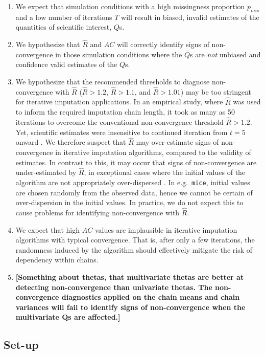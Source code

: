 \documentclass[Royal,times,sageh]{sagej}
\begin{document}
\begin{enumerate}
\def\labelenumi{\arabic{enumi}.}
\item
  We expect that simulation conditions with a high missingness proportion \(p_{mis}\) and a low number of iterations \(T\) will result in biased, invalid estimates of the quantities of scientific interest, \(Q\)s.
\item
  We hypothesize that \(\widehat{R}\) and \(AC\) will correctly identify signs of non-convergence in those simulation conditions where the \(\bar{Q}\)s are \emph{not} unbiased and confidence valid estimates of the \(Q\)s.
\item
  We hypothesize that the recommended thresholds to diagnose non-convergence with \(\widehat{R}\) (\(\widehat{R} > 1.2\), \(\widehat{R} > 1.1\), and \(\widehat{R} > 1.01\)) may be too stringent for iterative imputation applications. In an empirical study, where \(\widehat{R}\) was used to inform the required imputation chain length, it took as many as 50 iterations to overcome the conventional non-convergence threshold \(\widehat{R}>1.2\). Yet, scientific estimates were insensitive to continued iteration from \(t=5\) onward \citep{lace07}. We therefore suspect that \(\widehat{R}\) may over-estimate signs of non-convergence in iterative imputation algorithms, compared to the validity of estimates. In contrast to this, it may occur that signs of non-convergence are under-estimated by \(\widehat{R}\), in exceptional cases where the initial values of the algorithm are not appropriately over-dispersed \citep[p.~437]{broo98}. In e.g.~\texttt{mice}, initial values are chosen randomly from the observed data, hence we cannot be certain of over-dispersion in the initial values. In practice, we do not expect this to cause problems for identifying non-convergence with \(\widehat{R}\).
\item
  We expect that high \(AC\) values are implausible in iterative imputation algorithms with typical convergence. That is, after only a few iterations, the randomness induced by the algorithm should effectively mitigate the risk of dependency within chains.
\item
  \textbf{{[}Something about thetas, that multivariate thetas are better at detecting non-convergence than univariate thetas. The non-convergence diagnostics applied on the chain means and chain variances will fail to identify signs of non-convergence when the multivariate Qs are affected.{]}}
\end{enumerate}

\hypertarget{set-up}{%
\subsection{Set-up}\label{set-up}}
\end{document}
